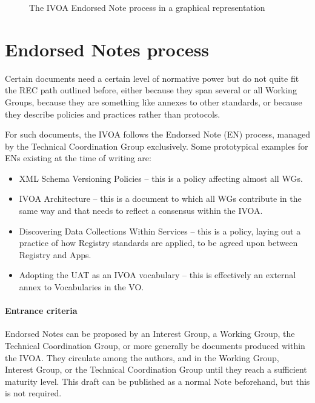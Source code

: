 \documentclass[11pt,a4paper]{ivoa}
\begin{document}
\begin{figure}
\begin{center}
\end{center}
\caption{The IVOA Endorsed Note process in a graphical representation}
\label{fig:ensummary}
\end{figure}


\section{Endorsed Notes process}
\label{sect:en}

Certain documents need a certain level of normative power but do not
quite fit the REC path outlined before, either because they span several
or all Working Groups, because they are something like annexes to other
standards, or because they describe policies and practices rather than
protocols.

For such documents, the IVOA follows the Endorsed Note (EN) process,
managed by the Technical Coordination Group exclusively.  Some
prototypical examples for ENs existing at the time of writing are:

\begin{itemize}
\item  	XML Schema Versioning Policies \citep{2018ivoa.spec.0529H} --
this is a policy affecting almost all WGs.

\item 	IVOA Architecture \citep{2024ivoa.spec.1114E} -- this is a
document to which all WGs contribute in the same way and that
needs to reflect a consensus within the IVOA.

\item Discovering Data Collections Within Services
\citep{2019ivoa.spec.0520D} -- this is a policy, laying out a practice
of how Registry standards are applied, to be agreed upon between
Registry and Apps.

\item Adopting the UAT as an IVOA vocabulary \citep{2022ivoa.spec.0722D}
-- this is effectively an external annex to Vocabularies in the VO.
\end{itemize}

\paragraph{Entrance  criteria}  Endorsed  Notes  can  be  proposed  by  an
Interest  Group,  a  Working Group,  the  Technical  Coordination
Group,  or  more  generally  be  documents  produced within the IVOA.
They circulate among the authors, and in the Working Group, Interest
Group,  or  the  Technical  Coordination  Group  until  they  reach  a
sufficient  maturity  level.  This draft can be published as a normal
Note beforehand, but this is not required.
\end{document}
